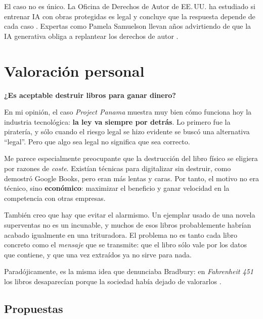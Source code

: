 \documentclass[11pt,a4paper,twoside,openright]{book}
\begin{document}
El caso no es único. La Oficina de Derechos de Autor de EE.\,UU. ha estudiado si
entrenar IA con obras protegidas es legal y concluye que la respuesta depende de
cada caso \cite{copyrightoffice2025}. Expertas como Pamela Samuelson llevan años
advirtiendo de que la IA generativa obliga a replantear los derechos de autor
\cite{samuelson2023}.

\chapter{Valoración personal}

\begin{center}
  \Large\textbf{¿Es aceptable destruir libros para ganar dinero?}
\end{center}

\begin{flushleft}
En mi opinión, el caso \textit{Project Panama} muestra muy bien cómo funciona hoy
la industria tecnológica: \textbf{la ley va siempre por detrás}. Lo primero fue
la piratería, y sólo cuando el riesgo legal se hizo evidente se buscó una
alternativa ``legal''. Pero que algo sea legal no significa que sea correcto.
\end{flushleft}

Me parece especialmente preocupante que la destrucción del libro físico se
eligiera por razones de \textit{coste}. Existían técnicas para digitalizar sin
destruir, como demostró Google Books, pero eran más lentas y caras. Por tanto, el
motivo no era técnico, sino \textbf{económico}: maximizar el beneficio y ganar
velocidad en la competencia con otras empresas.

También creo que hay que evitar el alarmismo. Un ejemplar usado de una novela
superventas no es un incunable, y muchos de esos libros probablemente habrían
acabado igualmente en una trituradora. El problema no es tanto cada libro
concreto como el \textit{mensaje} que se transmite: que el libro sólo vale por los
datos que contiene, y que una vez extraídos ya no sirve para nada.

{\footnotesize Paradójicamente, es la misma idea que denunciaba Bradbury: en
\textit{Fahrenheit 451} los libros desaparecían porque la sociedad había dejado de
valorarlos \cite{bradbury1953}.}

\section{Propuestas}
\end{document}
